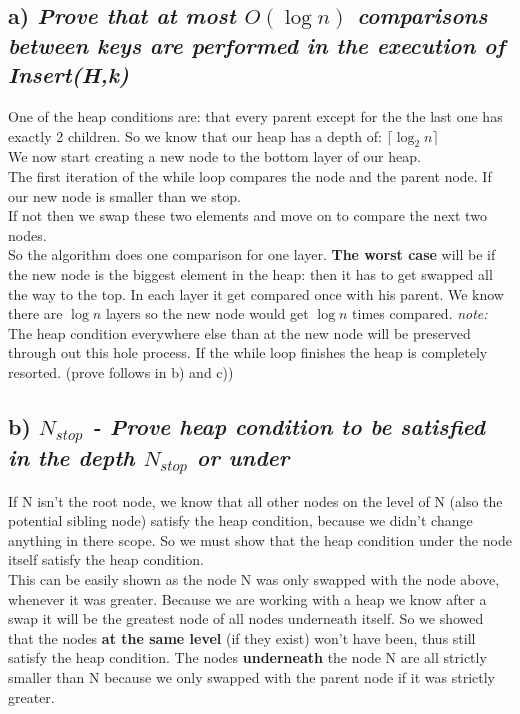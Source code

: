 \documentclass[12pt,letterpaper]{article}
\begin{document}
\subsection{a) \textit{Prove that at most $O(\log{n})$ comparisons between keys are performed in the execution of Insert(H,k)}}
One of the heap conditions are: that every parent except for the the last one has exactly 2 children. So we know that our heap has a depth of: $\lceil \log_{2}{n} \rceil$\\
We now start creating a new node to the bottom layer of our heap. \\
The first iteration of the while loop compares the node and the parent node. \bigbreak
If our new node is smaller than we stop.\\
If not then we swap these two elements and move on to compare the next two nodes.\\
So the algorithm does one comparison for one layer.\bigbreak 
\textbf{The worst case }will be if the new node is the biggest element in the heap: then it has to get swapped all the way to the top. In each layer it get compared once with his parent. We know there are $\log{n}$ layers so the new node  would get $\log{n}$ times compared.\bigbreak
\textit{note: } The heap condition everywhere else than at the new node will be preserved through out this hole process. If the while loop finishes the heap is completely resorted. (prove follows in b) and c))

\subsection{b) \textit{$N_{stop}$ - Prove heap condition to be satisfied in the depth $N_{stop}$ or under}}
If N isn't the root node, we know that all other nodes on the level of N (also the potential sibling node) satisfy the heap condition, because we didn't change anything in there scope.\bigbreak
So we must show that the heap condition under the node itself satisfy the heap condition.\\
This can be easily shown as the node N was only swapped with the node above, whenever it was greater. Because we are working with a heap we know after a swap it will be the greatest node of all nodes underneath itself.\bigbreak
So we showed that the nodes \textbf{at the same level} (if they exist) won't have been, thus still satisfy the heap condition. The nodes \textbf{underneath} the node N are all strictly smaller than N because we only swapped with the parent node if it was strictly greater.
\end{document}
